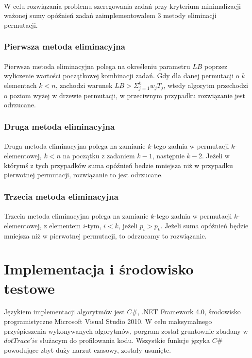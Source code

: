 \documentclass[wide,a4paper,titlepage,12pt] {article}
\begin{document}
\paragraph{}
W celu rozwiązania problemu szeregowania zadań przy kryterium minimalizacji ważonej sumy opóźnień zadań zaimplementowałem 3 metody eliminacji permutacji.
\subsubsection{Pierwsza metoda eliminacyjna}
\paragraph{}
Pierwsza metoda eliminacyjna polega na określeniu parametru $LB$ poprzez wyliczenie wartości początkowej kombinacji zadań. Gdy dla danej permutacji o $k$ elementach $k < n$, zachodzi warunek $LB >\Sigma_{j=1}^{k} w_{j} T_{j} $, wtedy algorytm przechodzi o poziom wyżej w drzewie permutacji, w przeciwnym przypadku rozwiązanie jest odrzucane.
\subsubsection{Druga metoda eliminacyjna}
\paragraph{}
Druga metoda eliminacyjna polega na zamianie $k$-tego zadnia w permutacji $k$-elementowej, $k < n$ na początku z zadaniem $k-1$, następnie $k-2$. Jeżeli w którymś z tych przypadków suma opóźnień bedzie mniejsza niż w przypadku pierwotnej permutacji, rozwiązanie to jest odrzucane.
\subsubsection{Trzecia metoda eliminacyjna}
\paragraph{}
Trzecia metoda eliminacyjna polega na zamianie $k$-tego zadnia w permutacji $k$-elementowej, z elementem $i$-tym, $i < k$, jeżeli $p_{i} > p_{k}$. Jeżeli suma opóźnień będzie mniejsza niż w pierwotnej permutacji, to odrzucamy to rozwiązanie.
\section{Implementacja i środowisko testowe}
\paragraph{}
Językiem implementacji algorytmów jest $C\#$, .NET Framework 4.0, środowisko programistyczne Microsoft Visual Studio 2010.  W celu maksymalnego przyśpieszenia wykonywanych algorytmów, porgram został gruntownie zbadany w $dotTrace'ie$ służacym do profilowania kodu. Wszystkie funkcje języka $C\#$ powodujące zbyt duży narzut czasowy, zostały usunięte.
\end{document}
